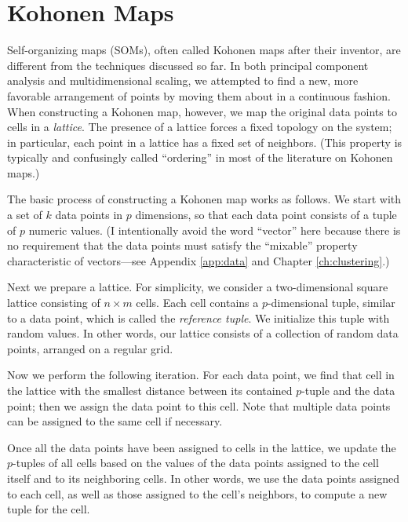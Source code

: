 \vspace*{-6pt}
\section{Kohonen Maps}


Self-organizing maps (SOMs), often called Kohonen maps after their
inventor, are different from the techniques discussed so far. In both
principal component analysis and multidimensional scaling, we
attempted\vadjust{\pagebreak} to find a new, more favorable
arrangement of points by moving them about in a continuous fashion.
When constructing a Kohonen map, however, we map the original data
points to cells in a \emph{lattice}. The presence of a lattice forces a
fixed topology on the system; in particular, each point in a lattice
has a fixed set of neighbors. (This property is typically and
confusingly called ``ordering'' in most of the literature on Kohonen
maps.)

The basic process of constructing a Kohonen map works as follows. We
start with a set of $k$ data points in $p$ dimensions, so that each
data point consists of a tuple of $p$ numeric values.  (I
intentionally avoid the word ``vector'' here because there is no
requirement that the data points must satisfy the ``mixable'' property
characteristic of vectors---see Appendix \ref{app:data} and Chapter
\ref{ch:clustering}.)

Next we prepare a lattice. For simplicity, we consider a
two-dimensional square lattice consisting of $n \times m$ cells.  Each
cell contains a $p$-dimensional tuple, similar to a data point, which
is called the \emph{reference tuple}. We initialize this tuple with
random values. In other words, our lattice consists of a collection of
random data points, arranged on a regular grid.

Now we perform the following iteration. For each data point, we find
that cell in the lattice with the smallest distance between its
contained $p$-tuple and the data point; then we assign the data point
to this cell. Note that multiple data points can be assigned to the
same cell if necessary.

Once all the data points have been assigned to cells in the lattice,
we update the $p$-tuples of all cells based on the values of the data
points assigned to the cell itself and to its neighboring cells. In
other words, we use the data points assigned to each cell, as well as
those assigned to the cell's neighbors, to compute a new tuple for the
cell.

